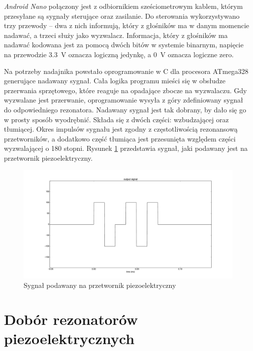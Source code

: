 

\textit{Android Nano} połączony jest z odbiornikiem sześciometrowym kablem, którym przesyłane są sygnały sterujące oraz zasilanie.
Do sterowania wykorzystywano trzy przewody -- dwa z nich informują, który z głośników ma w danym momencie nadawać,
a trzeci służy jako wyzwalacz. 
Informacja, który z głośników  ma nadawać kodowana jest za pomocą dwóch bitów w systemie binarnym,
napięcie na przewodzie \SI{3,3}{V} oznacza logiczną jedynkę, a \SI{0}{V} oznacza logiczne zero.

Na potrzeby nadajnika powstało oprogramowanie w C dla procesora ATmega328 generujące nadawany sygnał.
Cała logika programu mieści się w obsłudze przerwania sprzętowego, które reaguje na opadające zbocze na wyzwalaczu.
Gdy wyzwalane jest przerwanie, oprogramowanie wysyła z góry zdefiniowany sygnał do odpowiedniego rezonatora. 
Nadawany sygnał jest tak dobrany, by dało się go w prosty sposób wyodrębnić. Składa się z dwóch
części: wzbudzającej oraz tłumiącej.
Okres impulsów sygnału jest zgodny z częstotliwością rezonansową przetworników, a dodatkowo część tłumiąca
jest przesunięta względem części wyzwalającej o 180 stopni.  
Rysunek \ref{fig:output_signal} przedstawia sygnał, jaki podawany jest na przetwornik piezoelektryczny.

\begin{figure}[h]
    \centering
    \includegraphics[width=1.15\textwidth, trim= 47mm 0mm 0mm 0mm,clip]{output_signal}
    \caption{Sygnał podawany na przetwornik piezoelektryczny}
    \label{fig:output_signal}
\end{figure}

\section{Dobór rezonatorów piezoelektrycznych}

